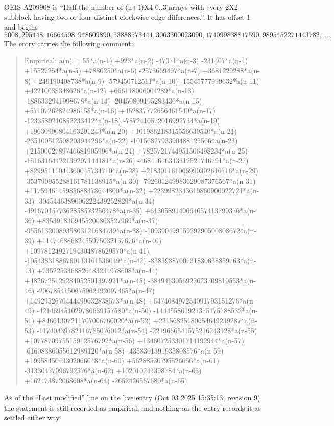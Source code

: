 \documentclass[11pt,a4paper]{article}
\theoremstyle{plain}
\theoremstyle{definition}
\begin{document}
OEIS A209908 is ``Half the number of (n+1)X4 0..3 arrays with every 2X2 subblock having two or four distinct clockwise edge differences.''. It has offset $1$ and begins
\[
5008, 295448, 16664508, 948609890, 53888573444, 3063300023090, 174099838817590, 9895452271443782,\ \dots
\]
The entry carries the following comment:
\begin{quote}\small
Empirical: a(n) = 55*a(n-1) +923*a(n-2) -47071*a(n-3) -231407*a(n-4) +15527254*a(n-5) +7880250*a(n-6) -2573669497*a(n-7) +3681229288*a(n-8) +249190408738*a(n-9) -579450712511*a(n-10) -15545777999632*a(n-11) +42210038348626*a(n-12) +666118006004289*a(n-13) -1886332941998678*a(n-14) -20450809195283436*a(n-15) +57107262824986158*a(n-16) +462837772656461540*a(n-17) -1233589210852233412*a(n-18) -7872410572016992734*a(n-19) +19630990804163291243*a(n-20) +101986218315556639540*a(n-21) -235100512508203944296*a(n-22) -1015682793390488125566*a(n-23) +2150002789746681905996*a(n-24) +7825721744951506498234*a(n-25) -15163164422139297144181*a(n-26) -46841616343312521746791*a(n-27) +82995111044360045734710*a(n-28) +218301161066990302616716*a(n-29) -353790955288161781138915*a(n-30) -792601249983629087376567*a(n-31) +1175946145985688378644800*a(n-32) +2239982343619860900022721*a(n-33) -3045446389006222439252829*a(n-34) -4916701577362858573256478*a(n-35) +6130589140664657413790376*a(n-36) +8353918309455200803527969*a(n-37) -9556132008935803121684739*a(n-38) -10939049915929290500808672*a(n-39) +11474688682455975032157676*a(n-40) +10978124927194304878629570*a(n-41) -10543831886760113161536049*a(n-42) -8383988700731830638859763*a(n-43) +7352253368826483234978608*a(n-44) +4826725129284052501397921*a(n-45) -3849463056922623709810553*a(n-46) -2067854150675962492097465*a(n-47) +1492952670444499632838573*a(n-48) +647468497254091793151276*a(n-49) -421469451029786639157580*a(n-50) -144455861921375175788532*a(n-51) +84661307211707006760020*a(n-52) +22156825180654649239287*a(n-53) -11740439782116785076012*a(n-54) -2219666541575216243128*a(n-55) +1077870975515912576792*a(n-56) +134607253301714192944*a(n-57) -61608386055612989120*a(n-58) -4358301391935808576*a(n-59) +1995845043302066048*a(n-60) +56288530795526656*a(n-61) -31330477096792576*a(n-62) +102010241398784*a(n-63) +162473872068608*a(n-64) -2652426567680*a(n-65)
\end{quote}
As of the ``Last modified'' line on the live entry (Oct 03 2025 15:35:13, revision 9) the statement is
still recorded as empirical, and nothing on the entry records it as settled either way.
\end{document}

